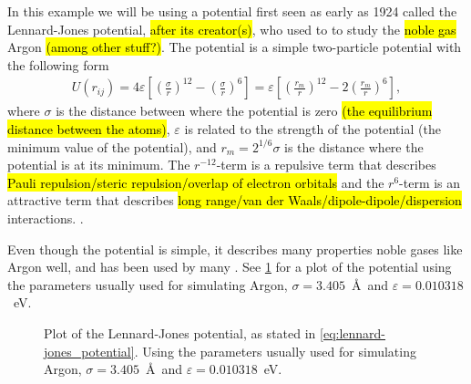 In this example we will be using a potential first seen as early as 1924\cite{jones1924potential} called the Lennard-Jones potential, \hl{after its creator(s)}, who used to to study the \hl{noble gas} Argon \hl{(among other stuff?)}. The potential is a simple two-particle potential with the following form
\begin{align}
    U(r_{ij}) = 4\varepsilon\left[ \left(\frac{\sigma}{r}\right)^{12} - \left(\frac{\sigma}{r}\right)^{6} \right]
    = \varepsilon\left[ \left(\frac{r_m}{r}\right)^{12} - 2\left(\frac{r_m}{r}\right)^{6} \right],
    \label{eq:lennard-jones_potential}
\end{align}
where $\sigma$ is the distance between where the potential is zero \hl{(the equilibrium distance between the atoms)}, $\varepsilon$ is related to the strength of the potential (the minimum value of the potential), and $r_m = 2^{1/6} \sigma$ is the distance where the potential is at its minimum. The $r^{-12}$-term is a repulsive term that describes \hl{Pauli repulsion/steric repulsion/overlap of electron orbitals} and the $r^{6}$-term is an attractive term that describes \hl{long range/van der Waals/dipole-dipole/dispersion} interactions. . 

Even though the potential is simple, it describes many properties noble gases like Argon well, and has been used by many . See \cref{fig:lennard-jones_potential} for a plot of the potential using the parameters usually used for simulating Argon\cite{frenkel2001understanding}, $\sigma = 3.405$~\AA\ and $\varepsilon = 0.010318$~eV.
%
\begin{figure}[htpb]%
    \centering%
    \caption{%
        Plot of the Lennard-Jones potential, as stated in \cref{eq:lennard-jones_potential}. Using the parameters usually used for simulating Argon\cite{frenkel2001understanding}, $\sigma = 3.405$~\AA\ and $\varepsilon = 0.010318$~eV.%
        \label{fig:lennard-jones_potential}%
    }%
\end{figure}%

